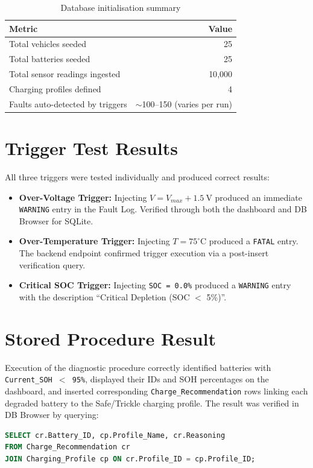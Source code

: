 \documentclass[12pt, a4paper]{report}
\begin{document}
\begin{table}[h]
    \centering
    \caption{Database initialisation summary}
    \begin{tabular}{@{} l r @{}}
        \toprule
        \textbf{Metric} & \textbf{Value} \\
        \midrule
        Total vehicles seeded         & 25 \\
        Total batteries seeded        & 25 \\
        Total sensor readings ingested & 10{,}000 \\
        Charging profiles defined     & 4 \\
        Faults auto-detected by triggers & $\sim$100--150 (varies per run) \\
        \bottomrule
    \end{tabular}
    \label{tab:results}
\end{table}

\section{Trigger Test Results}
All three triggers were tested individually and produced correct results:

\begin{itemize}
    \item \textbf{Over-Voltage Trigger:} Injecting $V = V_{max} + 1.5\ \text{V}$ produced an immediate \texttt{WARNING} entry in the Fault Log. Verified through both the dashboard and DB Browser for SQLite.
    \item \textbf{Over-Temperature Trigger:} Injecting $T = 75^\circ\text{C}$ produced a \texttt{FATAL} entry. The backend endpoint confirmed trigger execution via a post-insert verification query.
    \item \textbf{Critical SOC Trigger:} Injecting \texttt{SOC = 0.0\%} produced a \texttt{WARNING} entry with the description ``Critical Depletion (SOC $<$ 5\%)''.
\end{itemize}

\section{Stored Procedure Result}
Execution of the diagnostic procedure correctly identified batteries with \texttt{Current\_SOH $<$ 95\%}, displayed their IDs and SOH percentages on the dashboard, and inserted corresponding \texttt{Charge\_Recommendation} rows linking each degraded battery to the Safe/Trickle charging profile. The result was verified in DB Browser by querying:
\begin{lstlisting}[language=SQL, caption={Verification query for stored procedure output}]
SELECT cr.Battery_ID, cp.Profile_Name, cr.Reasoning
FROM Charge_Recommendation cr
JOIN Charging_Profile cp ON cr.Profile_ID = cp.Profile_ID;
\end{lstlisting}
\end{document}
